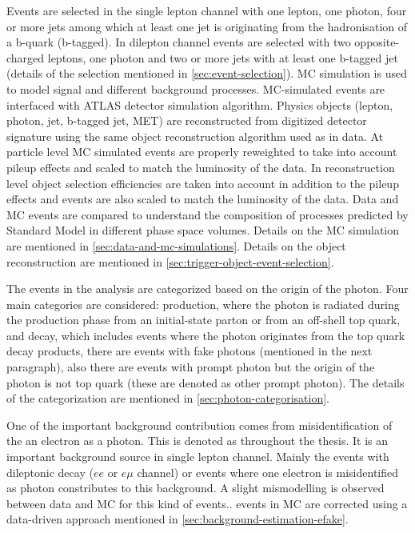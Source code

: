 Events are selected in the single lepton channel with one lepton, one photon, four or more jets among which at least one jet is originating from the hadronisation of a b-quark (b-tagged). In dilepton channel events are selected with two opposite-charged leptons, one photon and two or more jets with at least one b-tagged jet (details of the selection mentioned in \cref{sec:event-selection}). MC simulation is used to model signal and different background processes. MC-simulated events are interfaced with ATLAS detector simulation algorithm. Physics objects (lepton, photon, jet, b-tagged jet, MET) are reconstructed from digitized detector signature using the same object reconstruction algorithm used as in data. At particle level MC simulated events are properly reweighted to take into account pileup effects and scaled to match the luminosity of the data. In reconstruction level object selection efficiencies are taken into account in addition to the pileup effects and events are also scaled to match the luminosity of the data. Data and MC events are compared to understand the composition of processes predicted by Standard Model in different phase space volumes. Details on the MC simulation are mentioned in \cref{sec:data-and-mc-simulations}. Details on the object reconstruction are mentioned in \cref{sec:trigger-object-event-selection}.


The events in the analysis are categorized based on the origin of the photon. Four main categories are considered: \tty production, where the photon is radiated during the production phase from an initial-state parton or from an off-shell top quark, and \tty decay, which includes events where the photon originates from the top quark decay products, there are events with fake photons (mentioned in the next paragraph), also there are events with prompt photon but the origin of the photon is not top quark (these are denoted as other prompt photon). The details of the categorization are mentioned in \cref{sec:photon-categorisation}.

One of the important background contribution comes from misidentification of the an electron as a photon. This is denoted as \efake throughout the thesis. It is an important background source in single lepton channel. Mainly the \ttbar events with dileptonic decay ($ee$ or $e\mu$ channel) or \zee events where one electron is misidentified as photon constributes to this background. A slight mismodelling is observed between data and MC for this kind of events.. \efake events in MC are corrected using a data-driven approach mentioned in \cref{sec:background-estimation-efake}. 

